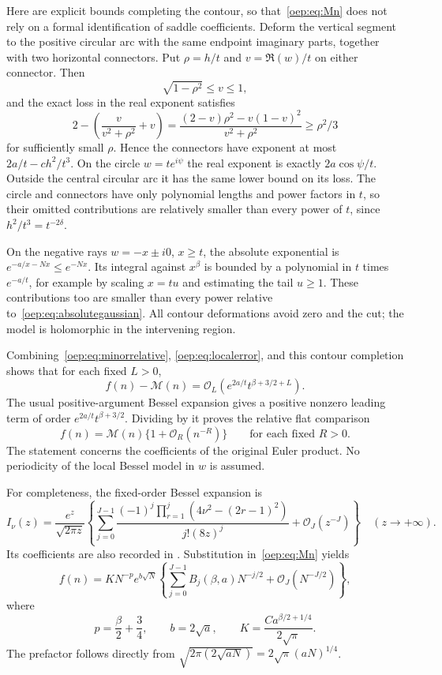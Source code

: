 \documentclass[11pt,letterpaper]{article}
\theoremstyle{remark}\newtheorem{remark}[theorem]{Remark}
\newcommand{\calM}{\mathcal M}
\newcommand{\OO}{\mathcal O}
\begin{document}
Here are explicit bounds completing the contour, so that~\eqref{oep:eq:Mn} does not rely on a formal identification of saddle coefficients. Deform the vertical segment to the positive circular arc with the same endpoint imaginary parts, together with two horizontal connectors. Put $\rho=h/t$ and $v=\Re(w)/t$ on either connector. Then
\[
 \sqrt{1-\rho^2}\leq v\leq1,
\]
and the exact loss in the real exponent satisfies
\begin{equation}\label{oep:eq:connector}
 2-\left(\frac{v}{v^2+\rho^2}+v\right)
 =\frac{(2-v)\rho^2-v(1-v)^2}{v^2+\rho^2}\geq\rho^2/3
\end{equation}
for sufficiently small $\rho$. Hence the connectors have exponent at most $2a/t-ch^2/t^3$. On the circle $w=te^{i\psi}$ the real exponent is exactly $2a\cos\psi/t$. Outside the central circular arc it has the same lower bound on its loss. The circle and connectors have only polynomial lengths and power factors in $t$, so their omitted contributions are relatively smaller than every power of $t$, since $h^2/t^3=t^{-2\delta}$.

On the negative rays $w=-x\pm i0$, $x\geq t$, the absolute exponential is $e^{-a/x-Nx}\leq e^{-Nx}$. Its integral against $x^\beta$ is bounded by a polynomial in $t$ times $e^{-a/t}$, for example by scaling $x=tu$ and estimating the tail $u\geq1$. These contributions too are smaller than every power relative to~\eqref{oep:eq:absolutegaussian}. All contour deformations avoid zero and the cut; the model is holomorphic in the intervening region.

Combining~\eqref{oep:eq:minorrelative}, \eqref{oep:eq:localerror}, and this contour completion shows that for each fixed $L>0$,
\[
 f(n)-\calM(n)=\OO_L\!\left(e^{2a/t}t^{\beta+3/2+L}\right).
\]
The usual positive-argument Bessel expansion \cite{dlmfasymptotic} gives a positive nonzero leading term of order $e^{2a/t}t^{\beta+3/2}$. Dividing by it proves the relative flat comparison
\begin{equation}\label{oep:eq:generalflat}
 f(n)=\calM(n)\{1+\OO_R(n^{-R})\}
 \qquad\text{for each fixed }R>0.
\end{equation}
The statement concerns the coefficients of the original Euler product. No periodicity of the local Bessel model in $w$ is assumed.

For completeness, the fixed-order Bessel expansion is
\[
 I_\nu(z)=\frac{e^z}{\sqrt{2\pi z}}
 \left\{\sum_{j=0}^{J-1}
 \frac{(-1)^j\prod_{r=1}^{j}(4\nu^2-(2r-1)^2)}{j!(8z)^j}
          +\OO_J(z^{-J})\right\}\quad(z\to+\infty).
\]
Its coefficients are also recorded in \cite{dlmfcoeff}. Substitution in~\eqref{oep:eq:Mn} yields
\begin{equation}\label{oep:eq:generalseries}
 f(n)=K N^{-p}e^{b\sqrt N}
 \left\{\sum_{j=0}^{J-1}B_j(\beta,a)N^{-j/2}+\OO_J(N^{-J/2})\right\},
\end{equation}
where
\begin{equation}\label{oep:eq:pkb}
 p=\frac\beta2+\frac34,\qquad b=2\sqrt a,\qquad
 K=\frac{Ca^{\beta/2+1/4}}{2\sqrt\pi}.
\end{equation}
The prefactor follows directly from $\sqrt{2\pi(2\sqrt{aN})}=2\sqrt\pi(aN)^{1/4}$.
\end{document}
